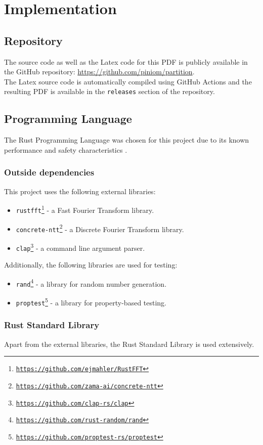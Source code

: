 \section{Implementation}

\subsection{Repository}
The source code as well as the Latex code for this PDF is publicly available in the GitHub repository: \url{https://github.com/piniom/partition}. \\
The Latex source code is automatically compiled using GitHub Actions and the resulting PDF is available in the \texttt{releases} section of the repository.

\subsection{Programming Language}
The Rust Programming Language was chosen for this project due to its known performance and safety characteristics \cite{rust_cpp}.

\subsubsection{Outside dependencies}
This project uses the following external libraries:
\begin{itemize}
    \item \texttt{rustfft\footnote{\url{https://github.com/ejmahler/RustFFT}}} - a Fast Fourier Transform library.
    \item \texttt{concrete-ntt\footnote{\url{https://github.com/zama-ai/concrete-ntt}}} - a Discrete Fourier Transform library.
    \item \texttt{clap\footnote{\url{https://github.com/clap-rs/clap}}} - a command line argument parser.
\end{itemize}
Additionally, the following libraries are used for testing:
\begin{itemize}
    \item \texttt{rand\footnote{\url{https://github.com/rust-random/rand}}} - a library for random number generation. 
    \item \texttt{proptest\footnote{\url{https://github.com/proptest-rs/proptest}}} - a library for property-based testing.
\end{itemize}

\subsubsection{Rust Standard Library}
Apart from the external libraries, the Rust Standard Library is used extensively.


